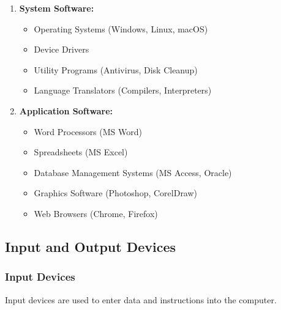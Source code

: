 \documentclass[12pt,a4paper]{article}
\begin{document}
\begin{enumerate}
    \item \textbf{System Software:}
    \begin{itemize}
        \item Operating Systems (Windows, Linux, macOS)
        \item Device Drivers
        \item Utility Programs (Antivirus, Disk Cleanup)
        \item Language Translators (Compilers, Interpreters)
    \end{itemize}
    
    \item \textbf{Application Software:}
    \begin{itemize}
        \item Word Processors (MS Word)
        \item Spreadsheets (MS Excel)
        \item Database Management Systems (MS Access, Oracle)
        \item Graphics Software (Photoshop, CorelDraw)
        \item Web Browsers (Chrome, Firefox)
    \end{itemize}
\end{enumerate}

\subsection{Input and Output Devices}

\subsubsection{Input Devices}
Input devices are used to enter data and instructions into the computer.
\end{document}

